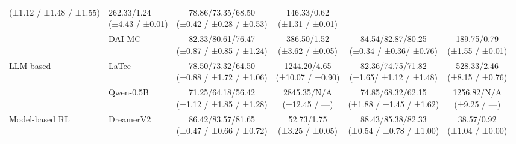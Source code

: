 \documentclass{article} %
\newcommand{\revise}[1]{#1}
\begin{document}
\begin{table}[t]
\begin{tabular}{l l c c c c}
{\revise{{\scriptsize (±1.12 / ±1.48 / ±1.55)}}} & \makecell[c]{262.33/1.24\\[-3pt]
\revise{{\scriptsize (±4.43 / ±0.01)}}} & \makecell[c]{78.86/73.35/68.50\\[-3pt]
\revise{{\scriptsize (±0.42 / ±0.28 / ±0.53)}}} & \makecell[c]{146.33/0.62\\[-3pt]
\revise{{\scriptsize (±1.31 / ±0.01)}}} \\
& DAI-MC   & \makecell[c]{82.33/80.61/76.47\\[-3pt]
\revise{{\scriptsize (±0.87 / ±0.85 / ±1.24)}}} & \makecell[c]{386.50/1.52\\[-3pt]
\revise{{\scriptsize (±3.62 / ±0.05)}}} & \makecell[c]{84.54/82.87/80.25\\[-3pt]
\revise{{\scriptsize (±0.34 / ±0.36/ ±0.76)}}} & \makecell[c]{189.75/0.79\\[-3pt]
\revise{{\scriptsize (±1.55 / ±0.01)}}} \\
\multirow{2}{*}{LLM-based}
& LaTee    & \makecell[c]{78.50/73.32/64.50\\[-3pt]
\revise{{\scriptsize (±0.88 / ±1.72 / ±1.06)}}} & \makecell[c]{1244.20/4.65\\[-3pt]
\revise{{\scriptsize (±10.07 / ±0.90)}}} & \makecell[c]{82.36/74.75/71.82\\[-3pt]
\revise{{\scriptsize (±1.65/ ±1.12 / ±1.48)}}} & \makecell[c]{528.33/2.46\\[-3pt]
\revise{{\scriptsize (±8.15 / ±0.76)}}} \\
& \revise{Qwen-0.5B} & \makecell[c]{71.25/64.18/56.42\\[-3pt]
\revise{{\scriptsize (±1.12 / ±1.85 / ±1.28)}}} & \makecell[c]{2845.35/N/A\\[-3pt]
\revise{{\scriptsize (±12.45 / ---)}}} & \makecell[c]{74.85/68.32/62.15\\[-3pt]
\revise{{\scriptsize (±1.88 / ±1.45 / ±1.62)}}} & \makecell[c]{1256.82/N/A\\[-3pt]
\revise{{\scriptsize (±9.25 / ---)}}} \\
Model-based RL & DreamerV2 & \makecell[c]{86.42/83.57/81.65\\[-3pt]
\revise{{\scriptsize (±0.47 / ±0.66 / ±0.72)}}} & \makecell[c]{52.73/1.75\\[-3pt]
\revise{{\scriptsize (±3.25 / ±0.05)}}} & \makecell[c]{88.43/85.38/82.33\\[-3pt]
\revise{{\scriptsize (±0.54 / ±0.78 / ±1.00)}}} & \makecell[c]{38.57/0.92\\[-3pt]
\revise{{\scriptsize (±1.04 / ±0.00)}}} \\

\end{tabular}
\end{table}
\end{document}
